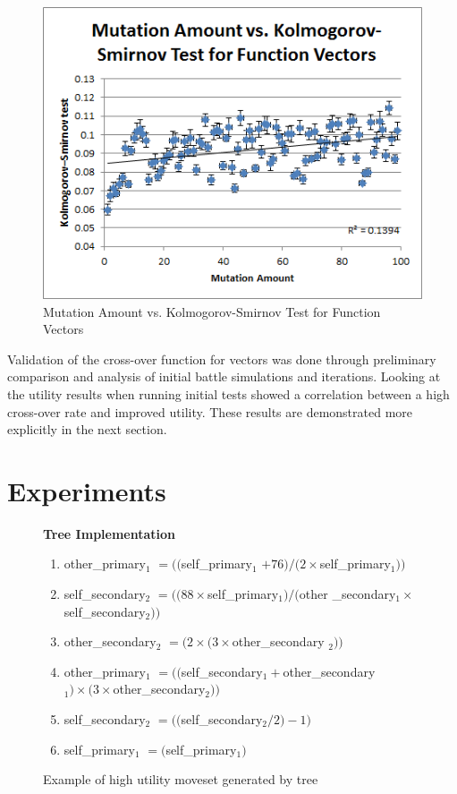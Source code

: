 \documentclass{acm_proc_article-sp}
\begin{document}
    \begin{figure}[h]
        \centering
        \includegraphics[width=\columnwidth]{./images/fv-mut-vs-ks-test.png}
        \caption{Mutation Amount vs. Kolmogorov-Smirnov Test for Function Vectors}
        \label{fv-mut-vs-ks-test}
    \end{figure}
    
    Validation of the cross-over function for vectors was done through preliminary comparison and analysis of initial battle simulations and iterations. Looking at the utility results when running initial tests showed a correlation between a high cross-over rate and improved utility. These results are demonstrated more explicitly in the next section.
    
    \section{Experiments}

    \begin{figure}[!ht]
    \centering
    \textbf {Tree Implementation} \\
    \begin{enumerate}
	\item  other\_primary$_1$ $= (($self\_primary$_1$ $ + 76) / (2 \times 
$self\_primary$_1$$))$
	\item  self\_secondary$_2 $ $= ((88 \times $self\_primary$_1) / ($other
\_secondary$_1 \times $self\_secondary$_2))$
	\item  other\_secondary$_2$ $=(2 \times (3 \times $other\_secondary
$_2))$
	\item  other\_primary$_1$ $= (($self\_secondary$_1 + $other\_secondary
$_1) \times (3 \times $other\_secondary$_2))$
	\item  self\_secondary$_2$ $= (($self\_secondary$_2 / 2) - 1)$
	\item  self\_primary$_1$ $= ($self\_primary$_1)$
    \end{enumerate}
    \caption{Example of high utility moveset generated by tree}
    \label{tree_moveset}
    \end{figure}
\end{document}
